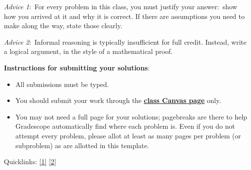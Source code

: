 \documentclass[12pt]{article}
\begin{document}
\renewcommand{\headrulewidth}{0.5pt}

\phantom{Test}

\begin{small}
\textit{Advice 1}:\ For every problem in this class, you must justify your answer:\ show how you arrived at it and why it is correct. If there are assumptions you need to make along the way, state those clearly.

\vspace{-3mm} 
\textit{Advice 2}:\ Informal reasoning is typically insufficient for full credit. Instead, write a logical argument, in the style of a mathematical proof.

\textbf{Instructions for submitting your solutions}:
\vspace{-5mm} 

\begin{itemize}
	\item All submissions must be typed.
	\item You should submit your work through the \href{https://canvas.colorado.edu/courses/59906}{\textbf{class Canvas page}} only.
	\item You may not need a full page for your solutions; pagebreaks are there to help Gradescope automatically find where each problem is. Even if you do not attempt every problem, please allot at least as many pages per problem (or subproblem) as are allotted in this template.
\end{itemize}

Quicklinks: \ref{1} \ref{2}
\vspace{-4mm} 
\end{small}


\hrulefill

\newpage
\end{document}

